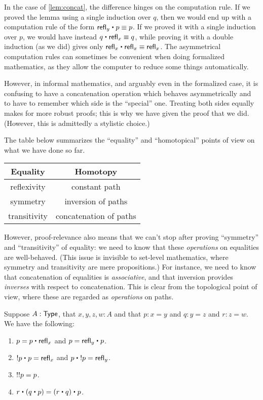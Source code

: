 In the case of \autoref{lem:concat}, the difference hinges on the computation rule.
If we proved the lemma using a single induction over $q$, then we would end up with a computation rule of the form $\refl{y} \ct p \jdeq p$.
If we proved it with a single induction over $p$, we would have instead $q\ct\refl{x}\jdeq q$, while proving it with a double induction (as we did) gives only $\refl{x}\ct\refl{x} \jdeq \refl{x}$.
The asymmetrical computation rules can sometimes be convenient when doing formalized mathematics, as they allow the computer to reduce some things automatically.

However, in informal mathematics, and arguably even in the formalized case, it is confusing to have a concatenation operation which behaves asymmetrically and to have to remember which side is the ``special'' one.
Treating both sides equally makes for more robust proofs; this is why we have given the proof that we did.
(However, this is admittedly a stylistic choice.)

The table below summarizes the ``equality'' and ``homotopical'' points of view on what we have done so far.
\begin{center}
  \begin{tabular}{c|c}
    Equality & Homotopy \\\hline
    reflexivity & constant path\\
    symmetry & inversion of paths\\
    transitivity & concatenation of paths
  \end{tabular}
\end{center}

However, proof-relevance also means that we can't stop after proving ``symmetry'' and  ``transitivity'' of equality: we need to know that these \emph{operations} on equalities are well-behaved.
(This issue is invisible to set-level mathematics, where symmetry and transitivity are mere propositions.)
For instance, we need to know that concatenation of equalities is \emph{associative}, and that inversion provides \emph{inverses} with respect to concatenation.
This is clear from the topological point of view, where these are regarded as \emph{operations} on paths.

\begin{lem}\label{thm:omg}%
  Suppose $A:\mathsf{Type}$, that $x,y,z,w:A$ and that $p:x= y$ and $q:y = z$ and $r:z=w$.
  We have the following:
  \begin{enumerate}
  \item $p= p\ct \refl{x}$ and $p = \refl{y} \ct p$.\label{item:omg1}
  \item $\opp{p}\ct p=  \refl{x}$ and $p\ct \opp{p}= \refl{y}$.
  \item $\mathord{!{\mathord{!{p}}}}= p$.
  \item $r\ct (q\ct p)=  (r\ct q)\ct p$.\label{item:omg4}
  \end{enumerate}
\end{lem}

